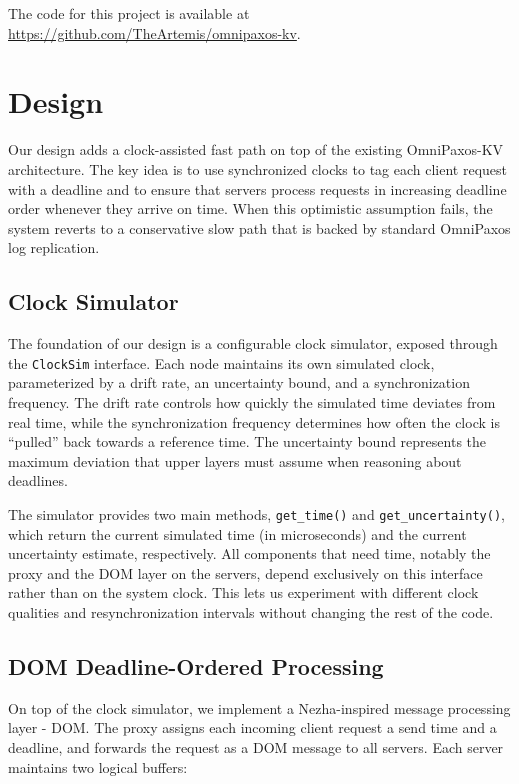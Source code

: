 \documentclass{article}
\begin{document}
The code for this project is available at \url{https://github.com/TheArtemis/omnipaxos-kv}.



\section{Design}
Our design adds a clock-assisted fast path on top of the existing OmniPaxos-KV architecture. The key idea is to use synchronized clocks to tag each client request with a deadline and to ensure that servers process requests in increasing deadline order whenever they arrive on time. When this optimistic assumption fails, the system reverts to a conservative slow path that is backed by standard OmniPaxos log replication.

\subsection{Clock Simulator}
The foundation of our design is a configurable clock simulator, exposed through the \texttt{ClockSim} interface. Each node maintains its own simulated clock, parameterized by a drift rate, an uncertainty bound, and a synchronization frequency. The drift rate controls how quickly the simulated time deviates from real time, while the synchronization frequency determines how often the clock is ``pulled'' back towards a reference time. The uncertainty bound represents the maximum deviation that upper layers must assume when reasoning about deadlines.

The simulator provides two main methods, \texttt{get\_time()} and \texttt{get\_uncertainty()}, which return the current simulated time (in microseconds) and the current uncertainty estimate, respectively. All components that need time, notably the proxy and the DOM layer on the servers, depend exclusively on this interface rather than on the system clock. This lets us experiment with different clock qualities and resynchronization intervals without changing the rest of the code.

\subsection{DOM Deadline-Ordered Processing}
On top of the clock simulator, we implement a Nezha-inspired message processing layer - DOM. The proxy assigns each incoming client request a send time and a deadline, and forwards the request as a DOM message to all servers. Each server maintains two logical buffers:
\end{document}
